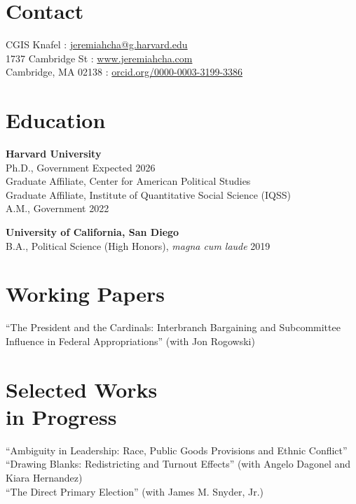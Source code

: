 \documentclass[margin, line]{res}
\begin{document}
\begin{resume}

\section{Contact}
CGIS Knafel \hfill \Letter: \href{mailto:jeremiahcha@g.harvard.edu}{jeremiahcha@g.harvard.edu}\\
1737 Cambridge St \hfill \Mundus: \href{httsp://www.jeremiahcha.com}{www.jeremiahcha.com}\\
Cambridge, MA 02138 \hfill \Mundus: \href{https://orcid.org/0000-0003-3199-3386}{orcid.org/0000-0003-3199-3386}

\section{Education}
\textbf{Harvard University}\\
\hspace*{5mm} Ph.D., Government \hfill Expected 2026\\
\hspace*{10mm}Graduate Affiliate, Center for American Political Studies\\
\hspace*{10mm}Graduate Affiliate, Institute of Quantitative Social Science (IQSS)\\
\hspace*{5mm} A.M., Government \hfill 2022

\textbf{University of California, San Diego}\\
\hspace*{5mm} B.A., Political Science (High Honors), \textit{magna cum laude} \hfill 2019

\section{Working Papers}
``The President and the Cardinals: Interbranch Bargaining and Subcommittee Influence in Federal Appropriations'' (with Jon Rogowski)

\section{Selected Works \\in Progress}
``Ambiguity in Leadership: Race, Public Goods Provisions and Ethnic Conflict''\\
``Drawing Blanks: Redistricting and Turnout Effects'' (with Angelo Dagonel and Kiara Hernandez)\\
``The Direct Primary Election'' (with James M. Snyder, Jr.)



\end{resume}
\end{document}
